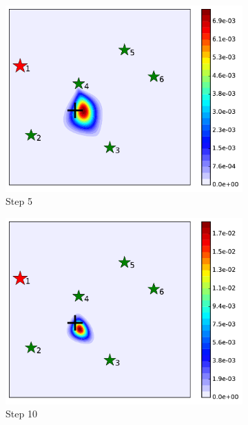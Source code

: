 \documentclass[journal]{IEEEtranTIE}
\theoremstyle{remark}
\begin{document}
\begin{figure}[p]
\begin{subfigure}{0.23\textwidth}
		\includegraphics[width=\textwidth]{figures/brg_sta_sen_sta_tar_rbt1_step5}
		\caption{Step 5}\label{fig:sta_sen_sta_tar_sing3}
	\end{subfigure}
	\begin{subfigure}{0.23\textwidth}%
		\includegraphics[width=\textwidth]{figures/brg_sta_sen_sta_tar_rbt1_step10}
		\caption{Step 10}\label{fig:sta_sen_sta_tar_sing4}
	\end{subfigure}
	\begin{subfigure}{0.23\textwidth}%

\end{subfigure}
\end{figure}
\end{document}
